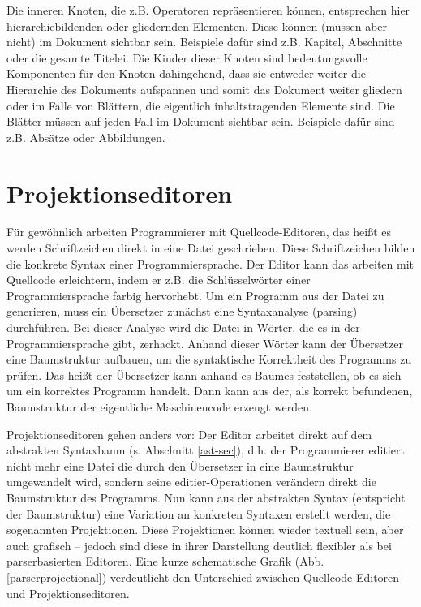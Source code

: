  
Die inneren Knoten, die z.B. Operatoren repräsentieren können, entsprechen hier hierarchiebildenden oder gliedernden Elementen. Diese können (müssen aber nicht) im Dokument sichtbar sein. Beispiele dafür sind z.B. Kapitel, Abschnitte oder die gesamte Titelei. Die Kinder dieser Knoten sind bedeutungsvolle Komponenten für den Knoten dahingehend, dass sie entweder weiter die Hierarchie des Dokuments aufspannen und somit das Dokument weiter gliedern oder im Falle von Blättern, die eigentlich inhaltstragenden Elemente sind. Die Blätter müssen auf jeden Fall im Dokument sichtbar sein. Beispiele dafür sind z.B. Absätze oder Abbildungen.

 
\section{Projektionseditoren}\label{Projektionseditoren-sec}
 
Für gewöhnlich arbeiten Programmierer mit Quellcode-Editoren, das heißt es werden Schriftzeichen direkt in eine Datei geschrieben. Diese Schriftzeichen bilden die konkrete Syntax einer Programmiersprache. Der Editor kann das arbeiten mit Quellcode erleichtern, indem er z.B. die Schlüsselwörter einer Programmiersprache farbig hervorhebt. Um ein Programm aus der Datei zu generieren, muss ein Übersetzer zunächst eine Syntaxanalyse (parsing) durchführen. Bei dieser Analyse wird die Datei in Wörter, die es in der Programmiersprache gibt, zerhackt. Anhand dieser Wörter kann der Übersetzer eine Baumstruktur aufbauen, um die syntaktische Korrektheit des Programms zu prüfen. Das heißt der Übersetzer kann anhand es Baumes feststellen, ob es sich um ein korrektes Programm handelt. Dann kann aus der, als korrekt befundenen, Baumstruktur der eigentliche Maschinencode erzeugt werden.

 
Projektionseditoren gehen anders vor: Der Editor arbeitet direkt auf dem abstrakten Syntaxbaum (s. Abschnitt \ref{ast-sec}), d.h. der Programmierer editiert nicht mehr eine Datei die durch den Übersetzer in eine Baumstruktur umgewandelt wird, sondern seine editier-Operationen verändern direkt die Baumstruktur des Programms. \citep[S.~68]{Voelter} Nun kann aus der abstrakten Syntax (entspricht der Baumstruktur) eine Variation an konkreten Syntaxen erstellt werden, die sogenannten Projektionen. Diese Projektionen können wieder textuell sein, aber auch grafisch -- jedoch sind diese in ihrer Darstellung deutlich flexibler als bei parserbasierten Editoren. Eine kurze schematische Grafik (Abb. \ref{parserprojectional}) verdeutlicht den Unterschied zwischen Quellcode-Editoren und Projektionseditoren.

